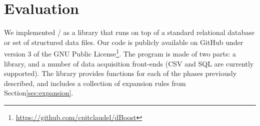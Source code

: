 \section{Evaluation}
\label{sec:evaluation}


We implemented \dBoost/ as a library that runs on top of a standard relational database or set of structured data files. Our code is publicly available on GitHub under version 3 of the GNU Public License\footnote{\url{https://github.com/cpitclaudel/dBoost}}. The program is made of two parts: a library, and a number of data acquisition front-ends (CSV and SQL are currently supported). The library provides functions for each of the phases previously described, and includes a collection of expansion rules from Section\ref{sec:expansion}.


%

